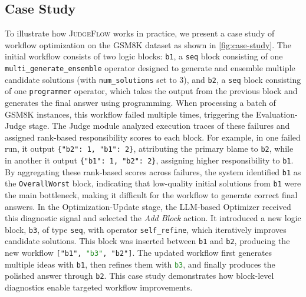 \documentclass{article}
\theoremstyle{plain}
\theoremstyle{definition}
\theoremstyle{remark}
\def \our{\textsc{JudgeFlow}}
\begin{document}
\subsection{Case Study}
To illustrate how \our{} works in practice, we present a case study of workflow optimization on the GSM8K dataset as shown in \cref{fig:case-study}. The initial workflow consists of two logic blocks: \texttt{b1}, a \texttt{seq} block consisting of one \texttt{multi\_generate\_ensemble} operator designed to generate and ensemble multiple candidate solutions (with \texttt{num\_solutions} set to 3), and \texttt{b2}, a \texttt{seq} block consisting of one \texttt{programmer} operator, which takes the output from the previous block and generates the final answer using programming. When processing a batch of GSM8K instances, this workflow failed multiple times, triggering the Evaluation-Judge stage. The Judge module analyzed execution traces of these failures and assigned rank-based responsibility scores to each block. For example, in one failed run, it output \texttt{\{"b2": 1, "b1": 2\}}, attributing the primary blame to \texttt{b2}, while in another it output \texttt{\{"b1": 1, "b2": 2\}}, assigning higher responsibility to \texttt{b1}. By aggregating these rank-based scores across failures, the system identified \texttt{b1} as the \texttt{OverallWorst} block, indicating that low-quality initial solutions from \texttt{b1} were the main bottleneck, making it difficult for the workflow to generate correct final answers. In the Optimization-Update stage, the LLM-based Optimizer received this diagnostic signal and selected the \textit{Add Block} action. It introduced a new logic block, \texttt{b3}, of type \texttt{seq}, with operator \texttt{self\_refine}, which iteratively improves candidate solutions. This block was inserted between \texttt{b1} and \texttt{b2}, producing the new workflow \texttt{["b1", \textcolor{ForestGreen}{"b3"}, "b2"]}. The updated workflow first generates multiple ideas with \texttt{b1}, then refines them with \textcolor{ForestGreen}{\texttt{b3}}, and finally produces the polished answer through \texttt{b2}. This case study demonstrates how block-level diagnostics enable targeted workflow improvements.
\end{document}
